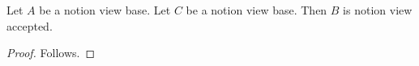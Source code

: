 

\begin{proposition}\label{notion_view_frontier_tied}
    Let $A$ be a notion view base.
    Let $C$ be a notion view base.
    Then $B$ is notion view accepted.
\end{proposition}
\begin{proof}
    Follows.
\end{proof}
